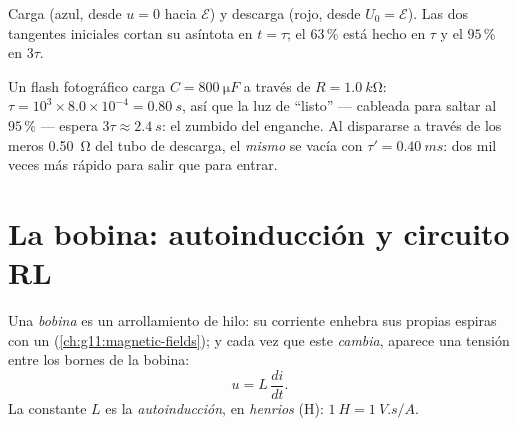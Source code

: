 \begin{omfigure}

{\small Carga (azul, desde $u = 0$ hacia $\mathcal{E}$) y descarga (rojo, desde
$U_0 = \mathcal{E}$). Las dos tangentes iniciales cortan su asíntota en $t = \tau$; el
$63\,\%$ está hecho en $\tau$ y el $95\,\%$ en $3\tau$.}
\end{omfigure}

\begin{example}\label{ex:g12:rc-rl-circuits:flashrc}
Un flash fotográfico carga $C = \qty{800}{\micro F}$ a través de
$R = \qty{1.0}{k\ohm}$: $\tau = 10^3 \times 8.0\times10^{-4} = \qty{0.80}{s}$, así que
la luz de ``listo'' --- cableada para saltar al $95\,\%$ --- espera
$3\tau \approx \qty{2.4}{s}$: el zumbido del enganche. Al dispararse a través de los
meros \qty{0.50}{\ohm} del tubo de descarga, el \emph{mismo}  se vacía con
$\tau' = \qty{0.40}{ms}$: dos mil veces más rápido para salir que para entrar.
\end{example}

\section{La bobina: autoinducción y circuito RL}

\begin{definition}\label{def:g12:rc-rl-circuits:inductor}
Una \emph{bobina} es un arrollamiento de hilo: su corriente enhebra sus
propias espiras con un  (\cref{ch:g11:magnetic-fields}); y cada vez que
este \emph{cambia}, aparece una tensión entre los bornes de la bobina:
\[
u = L\,\frac{di}{dt} .
\]
La constante $L$ es la \emph{autoinducción}, en
\emph{henrios} (\unit{H}): $\qty{1}{H} = \qty{1}{V.s/A}$.
\end{definition}
\admitted

